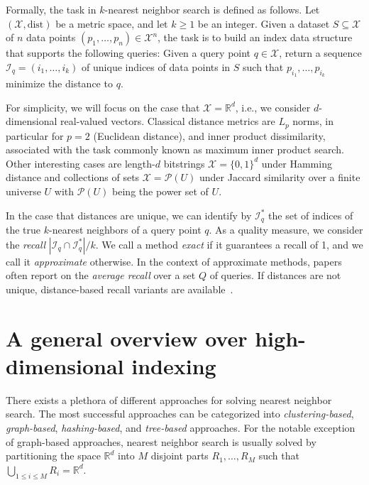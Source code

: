 \documentclass[11pt]{article}
\begin{document}
Formally, the task in $k$-nearest neighbor search is defined as follows.
Let $(\mathcal{X},
	\textrm{dist})$ be a metric space, and let $k \geq 1$ be an integer. Given
a dataset $S \subseteq \mathcal{X}$ of $n$ data points $(p_1, \ldots, p_n) \in \mathcal{X}^n$, the task is to build an index data
structure that supports the following queries: Given a query point $q \in
	\mathcal{X}$, return a sequence $\mathcal{I}_q = (i_1, \ldots, i_k)$ of unique indices of
data points in $S$ such that $p_{i_1}, \ldots, p_{i_k}$ minimize the
distance to $q$.

For simplicity, we will focus on the case that $\mathcal{X} = \mathbb{R}^d$, i.e., we consider $d$-dimensional real-valued vectors.
Classical distance metrics are $L_p$ norms, in particular for $p = 2$ (Euclidean distance), and inner product dissimilarity, associated with the task commonly known as maximum inner product search.
Other interesting cases are length-$d$ bitstrings $\mathcal{X} = \{0,1\}^d$ under Hamming distance and collections of sets $\mathcal{X} = \mathcal{P}(U)$ under Jaccard similarity over a finite universe $U$ with $\mathcal{P}(U)$ being the power set of $U$.


In the case that distances are unique, we can identify by $\mathcal{I}_q^\ast$ the set of indices of the true $k$-nearest neighbors of a query point $q$.
As a quality measure, we consider the \emph{recall} $|\mathcal{I}_q \cap \mathcal{I}^\ast_q|/k$. We call a method \emph{exact} if it guarantees a recall of 1, and we call it \emph{approximate} otherwise.
In the context of approximate methods, papers often report on the \emph{average recall} over a set $Q$ of queries.
If distances are not unique, distance-based recall variants are available~\cite{DBLP:journals/is/AumullerBF20}.

\section{A general overview over high-dimensional indexing}
\label{matteo_sec:overview}

There exists a plethora of different approaches for solving nearest
neighbor search. The most successful approaches can be categorized
into \textit{clustering-based}, \textit{graph-based},
\textit{hashing-based}, and \textit{tree-based} approaches.
For the notable exception of graph-based approaches, nearest neighbor search is usually solved by partitioning the space $\mathbb{R}^d$ into $M$ disjoint parts $R_1, \ldots, R_M$ such that $\bigcup_{1 \leq i \leq M} R_i = \mathbb{R}^d$.
\end{document}
